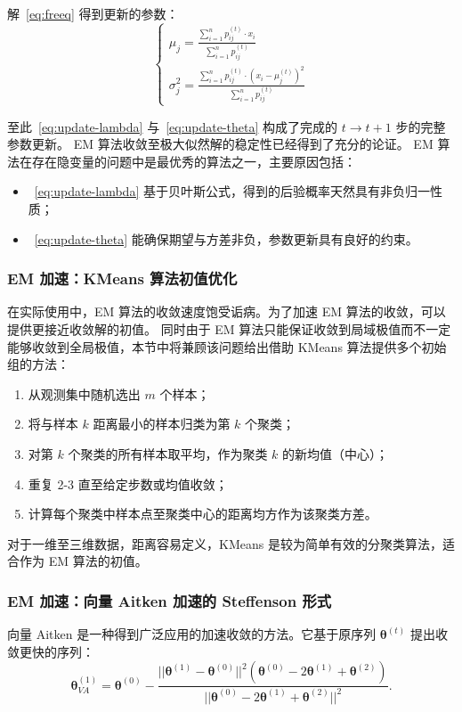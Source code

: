 解~\ref{eq:freeq} 得到更新的参数：
\begin{equation}
    \label{eq:update-theta}
    \begin{cases}
        \mu_j=\frac{\sum_{i=1}^np_{ij}^{(t)}\cdot x_i}{\sum_{i=1}^np_{ij}^{(t)}} \\
        \sigma_j^2=\frac{\sum_{i=1}^np_{ij}^{(t)}\cdot\left(x_i-\mu_j^{(t)}\right)^2}{\sum_{i=1}^np_{ij}^{(t)}}
    \end{cases}
\end{equation}

至此~\eqref{eq:update-lambda} 与~\eqref{eq:update-theta} 构成了完成的 $t\rightarrow t+1$ 步的完整参数更新。
EM 算法收敛至极大似然解的稳定性已经得到了充分的论证。
EM 算法在存在隐变量的问题中是最优秀的算法之一，主要原因包括：
\begin{itemize}
    \item~\eqref{eq:update-lambda} 基于贝叶斯公式，得到的后验概率天然具有非负归一性质；
    \item~\eqref{eq:update-theta} 能确保期望与方差非负，参数更新具有良好的约束。
\end{itemize}

\subsubsection{EM 加速：KMeans 算法初值优化}
在实际使用中，EM 算法的收敛速度饱受诟病。为了加速 EM 算法的收敛，可以提供更接近收敛解的初值。
同时由于 EM 算法只能保证收敛到局域极值而不一定能够收敛到全局极值，本节中将兼顾该问题给出借助 KMeans 算法提供多个初始组的方法：

\begin{enumerate}
    \item 从观测集中随机选出 $m$ 个样本；
    \item 将与样本 $k$ 距离最小的样本归类为第 $k$ 个聚类；
    \item 对第 $k$ 个聚类的所有样本取平均，作为聚类 $k$ 的新均值（中心）；
    \item 重复 2-3 直至给定步数或均值收敛；
    \item 计算每个聚类中样本点至聚类中心的距离均方作为该聚类方差。
\end{enumerate}

对于一维至三维数据，距离容易定义，KMeans 是较为简单有效的分聚类算法，适合作为 EM 算法的初值。

\subsubsection{EM 加速：向量 Aitken 加速的 Steffenson 形式}
向量 Aitken 是一种得到广泛应用的加速收敛的方法。它基于原序列 $\boldsymbol{\theta}^{(t)}$ 提出收敛更快的序列：
\begin{equation}
    \label{eq:vector-aitken}
    \boldsymbol{\theta}_{VA}^{(1)}=\boldsymbol{\theta}^{(0)}-
    \frac{||\boldsymbol{\theta}^{(1)}-\boldsymbol{\theta}^{(0)}||^2
    (\boldsymbol{\theta}^{(0)}-2\boldsymbol{\theta}^{(1)}+\boldsymbol{\theta}^{(2)})}
    {||\boldsymbol{\theta}^{(0)}-2\boldsymbol{\theta}^{(1)}+\boldsymbol{\theta}^{(2)}||^2}.
\end{equation}

